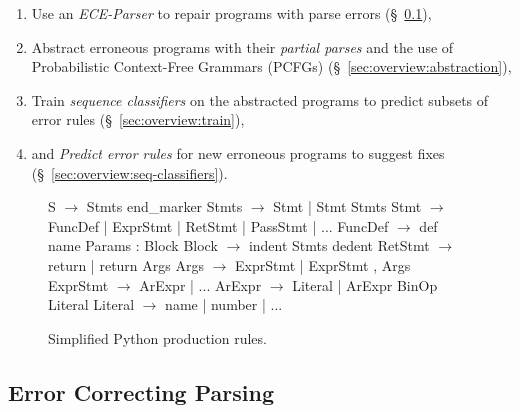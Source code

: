 \begin{enumerate}

  \item Use an \emph{ECE-Parser} to repair programs with parse errors
  (\S~\ref{sec:overview:ec-parsing}),

  \item Abstract erroneous programs with their \emph{partial parses} and the
  use of Probabilistic Context-Free Grammars (PCFGs)
  (\S~\ref{sec:overview:abstraction}),

  \item Train \emph{sequence classifiers} on the abstracted programs to predict
  subsets of error rules (\S~\ref{sec:overview:train}),

  \item and \emph{Predict error rules} for new erroneous programs to
  suggest fixes (\S~\ref{sec:overview:seq-classifiers}).

\end{enumerate}

\begin{figure}[t]
\begin{minipage}[c]{0.47\linewidth}
\begin{rules}
S        $\rightarrow$ Stmts end_marker
Stmts    $\rightarrow$ Stmt \n | Stmt \n Stmts
Stmt     $\rightarrow$ FuncDef | ExprStmt
          | RetStmt | PassStmt | ...
FuncDef  $\rightarrow$ def name Params : Block
Block    $\rightarrow$ \n indent Stmts dedent
RetStmt  $\rightarrow$ return | return Args
Args     $\rightarrow$ ExprStmt | ExprStmt , Args
ExprStmt $\rightarrow$ ArExpr | ...
ArExpr   $\rightarrow$ Literal
          | ArExpr BinOp Literal
Literal  $\rightarrow$ name | number | ...
\end{rules}
\caption{Simplified Python production rules.}
\label{fig:production-rules}
\end{minipage}
\hspace{0.02\linewidth}%
\begin{minipage}[c]{0.50\linewidth}
\hspace*{-0.06\linewidth}%

\end{minipage}
\end{figure}

\subsection{Error Correcting Parsing}
\label{sec:overview:ec-parsing}

